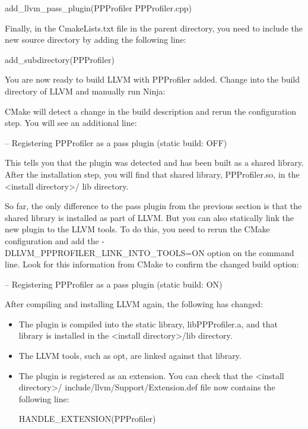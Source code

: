 \begin{cmake}
add_llvm_pass_plugin(PPProfiler PPProfiler.cpp)
\end{cmake}

Finally, in the CmakeLists.txt file in the parent directory, you need to include the new source directory by adding the following line:

\begin{cmake}
add_subdirectory(PPProfiler)
\end{cmake}

You are now ready to build LLVM with PPProfiler added. Change into the build directory of LLVM and manually run Ninja:


CMake will detect a change in the build description and rerun the configuration step. You will see an additional line:

\begin{shell}
-- Registering PPProfiler as a pass plugin (static build: OFF)
\end{shell}

This tells you that the plugin was detected and has been built as a shared library. After the installation step, you will find that shared library, PPProfiler.so, in the <install directory>/ lib directory.

So far, the only difference to the pass plugin from the previous section is that the shared library is installed as part of LLVM. But you can also statically link the new plugin to the LLVM tools. To do this, you need to rerun the CMake configuration and add the -DLLVM\_PPPROFILER\_LINK\_INTO\_TOOLS=ON option on the command line. Look for this information from CMake to confirm the changed build option:

\begin{shell}
-- Registering PPProfiler as a pass plugin (static build: ON)
\end{shell}

After compiling and installing LLVM again, the following has changed:

\begin{itemize}
\item
The plugin is compiled into the static library, libPPProfiler.a, and that library is installed in the <install directory>/lib directory.

\item
The LLVM tools, such as opt, are linked against that library.

\item
The plugin is registered as an extension. You can check that the <install directory>/ include/llvm/Support/Extension.def file now contains the following line:

\begin{shell}
HANDLE_EXTENSION(PPProfiler)
\end{shell}
\end{itemize}

